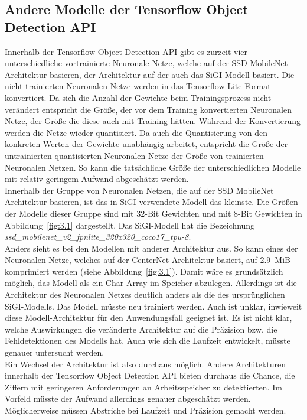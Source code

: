 \subsection{Andere Modelle der Tensorflow Object Detection API}
    Innerhalb der Tensorflow Object Detection API gibt es zurzeit vier unterschiedliche vortrainierte Neuronale Netze, welche auf der SSD MobileNet Architektur basieren, der Architektur auf der auch das SiGI Modell basiert. Die nicht trainierten Neuronalen Netze werden in das Tensorflow Lite Format konvertiert. Da sich die Anzahl der Gewichte beim Trainingsprozess nicht verändert entspricht die Größe, der vor dem Training konvertierten Neuronalen Netze, der Größe die diese auch mit Training hätten. Während der Konvertierung werden die Netze wieder quantisiert. Da auch die Quantisierung von den konkreten Werten der Gewichte unabhängig arbeitet, entspricht die Größe der untrainierten quantisierten Neuronalen Netze der Größe von trainierten Neuronalen Netzen. So kann die tatsächliche Größe der unterschiedlichen Modelle mit relativ geringem Aufwand abgeschätzt werden.\\ Innerhalb der Gruppe von Neuronalen Netzen, die auf der SSD MobileNet Architektur basieren, ist das in SiGI verwendete Modell das kleinste. Die Größen der Modelle dieser Gruppe sind mit 32-Bit Gewichten und mit 8-Bit Gewichten in Abbildung~\ref{fig:3.1} dargestellt. Das SiGI-Modell hat die Bezeichnung \textit{ssd\_mobilenet\_v2\_fpnlite\_320x320\_coco17\_tpu-8}.\\ Anders sieht es bei den Modellen mit anderer Architektur aus. So kann eines der Neuronalen Netze, welches auf der CenterNet Architektur basiert, auf \SI{2,9}{MiB} komprimiert werden (siehe Abbildung~\ref{fig:3.1}). Damit wäre es grundsätzlich möglich, das Modell als ein Char-Array im Speicher abzulegen. Allerdings ist die Architektur des Neuronalen Netzes deutlich anders als die des ursprünglichen SiGI-Modells. Das Modell müsste neu trainiert werden. Auch ist unklar, inwieweit diese Modell-Architektur für den Anwendungsfall geeignet ist. Es ist nicht klar, welche Auswirkungen die veränderte Architektur auf die Präzision bzw. die Fehldetektionen des Modells hat. Auch wie sich die Laufzeit entwickelt, müsste genauer untersucht werden.\\ Ein Wechsel der Architektur ist also durchaus möglich. Andere Architekturen innerhalb der Tensorflow Object Detection API bieten durchaus die Chance, die Ziffern mit geringeren Anforderungen an Arbeitsspeicher zu detektierten. Im Vorfeld müsste der Aufwand allerdings genauer abgeschätzt werden. Möglicherweise müssen Abstriche bei Laufzeit und Präzision gemacht werden. 
    

